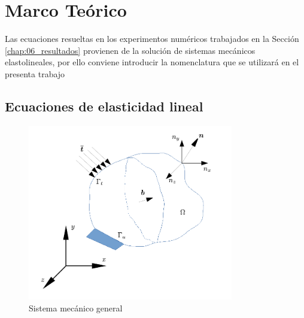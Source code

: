 \graphicspath{{./Imagenes/03/}}

\chapter{Marco Teórico}

Las ecuaciones resueltas en los experimentos numéricos trabajados en la Sección \ref{chap:06_resultados} provienen de la solución de sistemas mecánicos elastolineales, por ello conviene introducir la nomenclatura que se utilizará en el presenta trabajo

\section{Ecuaciones de elasticidad lineal}

\begin{figure}[h]
    \centering
    \includegraphics[width=0.8\textwidth]{sistema.pdf}
    \caption{Sistema mecánico general} \label{fig:sistema_general}
\end{figure}

